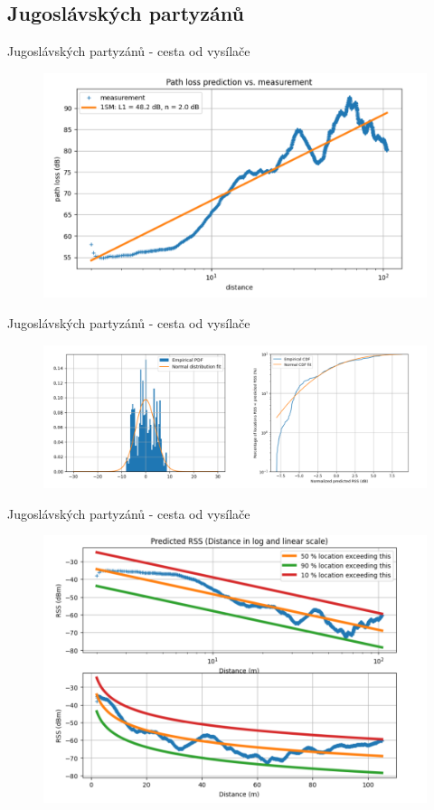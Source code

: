 \documentclass[aspectratio=169, 12pt, hyperref={unicode}]{beamer}
\begin{document}
\subsection{Jugoslávských partyzánů}
	\begin{frame}{Jugoslávských partyzánů - cesta od vysílače}
		\begin{figure}[!ht]
			\centering
			\includegraphics[width=.75\textwidth]{src/partyzanu-od-vysilace-1.png}
		\end{figure}
	\end{frame}
	\begin{frame}{Jugoslávských partyzánů - cesta od vysílače}
		\begin{figure}[!ht]
			\centering
			\includegraphics[width=\textwidth]{src/partyzanu-od-vysilace-2.png}
		\end{figure}
	\end{frame}
	\begin{frame}{Jugoslávských partyzánů - cesta od vysílače}
		\begin{figure}[!ht]
			\centering
			\includegraphics[width=.6\textwidth]{src/partyzanu-od-vysilace-3.png}
		\end{figure}
	\end{frame}
\end{document}
